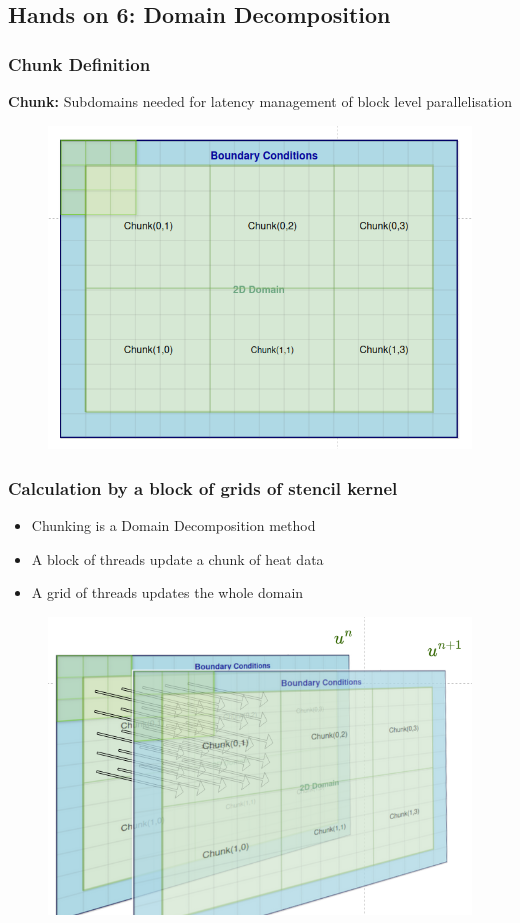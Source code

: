 \documentclass[9pt]{beamer}
\begin{document}
\subsection{Hands on 6: Domain Decomposition}
\begin{frame}
\frametitle{Chunk Definition}
\textbf{Chunk:} Subdomains needed for latency management of block level parallelisation
\vspace{-0.5\baselineskip}
\begin{figure}
    \centering
    \includegraphics[height=0.78\textheight]{Screenshot from 2024-09-02 14-11-22.png}
    \label{fig:enter-label}
\end{figure}
\end{frame}

\begin{frame}
\frametitle{Calculation by a block of grids of stencil kernel}
\begin{itemize}

    \item Chunking is a Domain Decomposition method
    \item A block of threads update a chunk of heat data
    \item A grid of threads updates the whole domain
\end{itemize}
\begin{figure}
    \centering
    \includegraphics[width=0.75\linewidth]{Screenshot from 2024-09-04 13-55-10.png}
\end{figure}
\end{frame}
\end{document}
